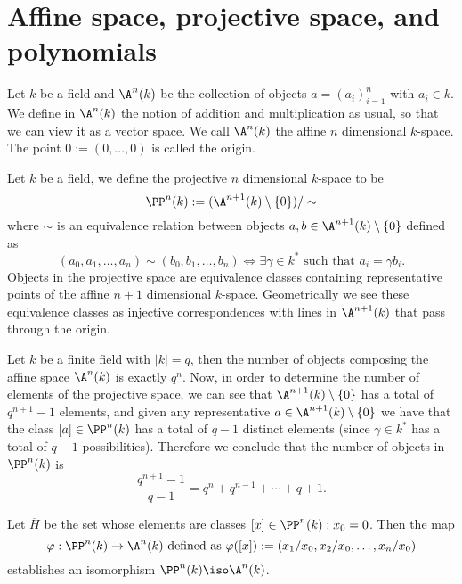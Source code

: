 \section{Affine space, projective space, and polynomials}

\begin{definition}
   Let \(k\) be a field and \(\A^n(k)\) be the collection of objects \(a =
   (a_i)_{i=1}^{n}\) with \(a_i \in k\). We define in \(\A^n(k)\) the notion of
   addition and multiplication as usual, so that we can view it as a vector
   space. We call \(\A^n(k)\) the affine \(n\) dimensional \(k\)-space. The
   point \(0 := (0, \dots, 0)\) is called the origin.
\end{definition}

\begin{definition}
   Let \(k\) be a field, we define the projective  \(n\) dimensional
   \(k\)-space to be
   \[
      \PP^n(k) := (\A^{n+1}(k)\setminus\{0\})/\sim
   \] 
   where \(\sim\) is an equivalence relation between objects \(a, b \in
   \A^{n+1}(k) \setminus \{0\} \) defined as
   \[
      (a_0, a_1, \dots, a_n) \sim (b_0, b_1, \dots, b_n) \Leftrightarrow \exists
      \gamma \in k^\ast \text{ such that } a_i = \gamma b_i.
   \] 
   Objects in the projective space are equivalence classes containing
   representative points of the affine \(n+1\) dimensional \(k\)-space.
   Geometrically we see these equivalence classes as injective correspondences
   with lines in \(\A^{n+1}(k)\) that pass through the origin.
\end{definition}

Let \(k\) be a finite field with  \(|k| = q \), then the number of objects
composing the affine space \(\A^n(k)\) is exactly  \(q^n\). Now, in order to
determine the number of elements of the projective space, we can see that
\(\A^{n+1}(k) \setminus \{0\} \) has a total of \(q^{n+1} - 1\) elements, and
given any representative \(a \in \A^{n+1}(k) \setminus \{0\} \) we have that the
class \([a] \in \PP^n(k)\) has a total of \(q-1\) distinct elements (since
\(\gamma \in k^\ast\) has a total of \(q-1\) possibilities). Therefore we
conclude that the number of objects in \(\PP^{n}(k)\) is
 \[
    \frac{q^{n+1}-1}{q-1} = q^n + q^{n-1} + \cdots + q + 1.
\] 

\begin{lemma}
   Let \(\overline{H}\) be the set whose elements are classes \([x] \in \PP^n(k)
   : x_0 = 0\). Then the map 
   \[
      \varphi: \PP^{n}(k) \to \A^n(k) \text{ defined as } \varphi([x]) :=
      (x_1/x_0, x_2/x_0, \dots, x_n/x_0)
   \] 
   establishes an isomorphism \(\PP^{n}(k) \iso \A^{n}(k)\).
\end{lemma}

